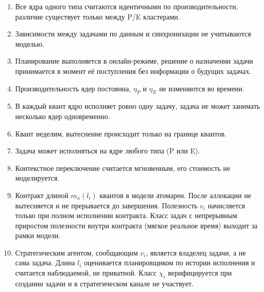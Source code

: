 \documentclass[14pt, oneside]{extbook}
\begin{document}
        \begin{enumerate}
                \item Все ядра одного типа считаются идентичными
                        по производительности, различие существует
                        только между P/E кластерами.
                \item Зависимости между задачами по данным
                        и синхронизации не учитываются моделью.
                \item Планирование выполняется в онлайн-режиме,
                        решение о назначении задачи принимается
                        в момент её поступления без информации
                        о будущих задачах.
                \item Производительность ядер постоянна,
                        $\eta_P$ и $\eta_E$ не изменяются во времени.
                \item В каждый квант ядро исполняет ровно одну
                        задачу, задача не может занимать несколько
                        ядер одновременно.
                \item Квант неделим, вытеснение происходит
                        только на границе квантов.
                \item Задача может исполняться на ядре
                        любого типа (P или E).
                \item Контекстное переключение считается
                        мгновенным, его стоимость не моделируется.
                \item\label{assum:atomic} Контракт длиной
                        $m_\kappa(l_i)$ квантов в модели атомарен.
                        После аллокации не вытесняется и не
                        прерывается до завершения. Полезность $v_i$
                        начисляется только при полном исполнении
                        контракта. Класс задач с непрерывным
                        приростом полезности внутри контракта
                        (мягкое реальное время) выходит за рамки
                        модели.
                \item\label{assum:nonstrategic}
                        Стратегическим агентом, сообщающим
                        $v_i$, является владелец задачи, а
                        не сама задача. Длина $l_i$ оценивается
                        планировщиком по истории исполнения и
                        считается наблюдаемой, не приватной. Класс
                        $\chi_i$ верифицируется при создании
                        задачи и в стратегическом канале не
                        участвует.
        \end{enumerate}
\end{document}
